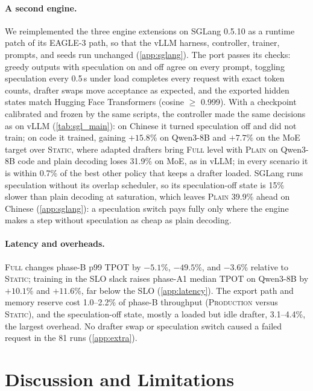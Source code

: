 \documentclass{article}
\newcommand{\pol}[1]{\textsc{#1}}
\begin{document}
\paragraph{A second engine.} We reimplemented the three engine extensions on SGLang 0.5.10 \citep{zheng2024sglang} as a runtime patch of its EAGLE-3 path, so that the vLLM harness, controller, trainer, prompts, and seeds run unchanged (\cref{app:sglang}). The port passes its checks: greedy outputs with speculation on and off agree on every prompt, toggling speculation every 0.5\,s under load completes every request with exact token counts, drafter swaps move acceptance as expected, and the exported hidden states match Hugging Face Transformers (cosine $\ge$ 0.999). With a checkpoint calibrated and frozen by the same scripts, the controller made the same decisions as on vLLM (\cref{tab:sgl_main}): on Chinese it turned speculation off and did not train; on code it trained, gaining $+15.8$\% on Qwen3-8B and $+7.7$\% on the MoE target over \pol{Static}, where adapted drafters bring \pol{Full} level with \pol{Plain} on Qwen3-8B code and plain decoding loses 31.9\% on MoE, as in vLLM; in every scenario it is within 0.7\% of the best other policy that keeps a drafter loaded. SGLang runs speculation without its overlap scheduler, so its speculation-off state is 15\% slower than plain decoding at saturation, which leaves \pol{Plain} 39.9\% ahead on Chinese (\cref{app:sglang}): a speculation switch pays fully only where the engine makes a step without speculation as cheap as plain decoding.

\paragraph{Latency and overheads.}\label{sec:overheads}\label{sec:latency} \pol{Full} changes phase-B p99 TPOT by $-5.1$\%, $-49.5$\%, and $-3.6$\% relative to \pol{Static}; training in the SLO slack raises phase-A1 median TPOT on Qwen3-8B by $+10.1$\% and $+11.6$\%, far below the SLO (\cref{app:latency}). The export path and memory reserve cost 1.0--2.2\% of phase-B throughput (\pol{Production} versus \pol{Static}), and the speculation-off state, mostly a loaded but idle drafter, 3.1--4.4\%, the largest overhead. No drafter swap or speculation switch caused a failed request in the 81 runs (\cref{app:extra}).


\section{Discussion and Limitations}\label{sec:limitations}
\end{document}
